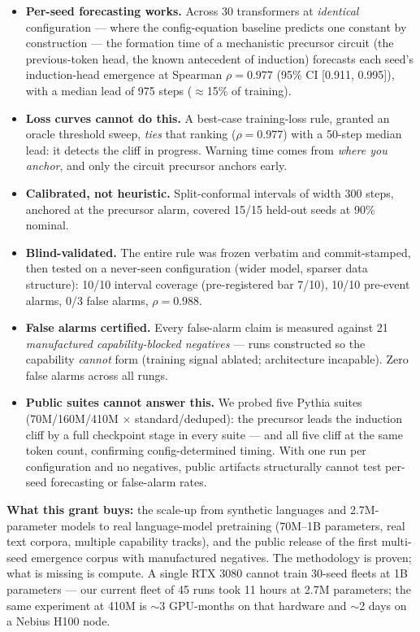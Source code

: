 \documentclass[11pt]{article}
\begin{document}
\begin{itemize}
\item \textbf{Per-seed forecasting works.} Across 30 transformers at \emph{identical}
  configuration --- where the config-equation baseline predicts one constant by
  construction --- the formation time of a mechanistic precursor circuit (the
  previous-token head, the known antecedent of induction) forecasts each seed's
  induction-head emergence at Spearman $\rho = 0.977$ (95\% CI [0.911, 0.995]), with a
  median lead of 975 steps ($\approx$15\% of training).
\item \textbf{Loss curves cannot do this.} A best-case training-loss rule, granted an
  oracle threshold sweep, \emph{ties} that ranking ($\rho = 0.977$) with a 50-step median
  lead: it detects the cliff in progress. Warning time comes from \emph{where you anchor},
  and only the circuit precursor anchors early.
\item \textbf{Calibrated, not heuristic.} Split-conformal intervals of width 300 steps,
  anchored at the precursor alarm, covered 15/15 held-out seeds at 90\% nominal.
\item \textbf{Blind-validated.} The entire rule was frozen verbatim and commit-stamped,
  then tested on a never-seen configuration (wider model, sparser data structure): 10/10
  interval coverage (pre-registered bar 7/10), 10/10 pre-event alarms, 0/3 false alarms,
  $\rho = 0.988$.
\item \textbf{False alarms certified.} Every false-alarm claim is measured against 21
  \emph{manufactured capability-blocked negatives} --- runs constructed so the capability
  \emph{cannot} form (training signal ablated; architecture incapable). Zero false alarms
  across all rungs.
\item \textbf{Public suites cannot answer this.} We probed five Pythia suites
  (70M/160M/410M $\times$ standard/deduped): the precursor leads the induction cliff by a
  full checkpoint stage in every suite --- and all five cliff at the same token count,
  confirming config-determined timing. With one run per configuration and no negatives,
  public artifacts structurally cannot test per-seed forecasting or false-alarm rates.
\end{itemize}

\textbf{What this grant buys:} the scale-up from synthetic languages and 2.7M-parameter
models to real language-model pretraining (70M--1B parameters, real text corpora, multiple
capability tracks), and the public release of the first multi-seed emergence corpus with
manufactured negatives. The methodology is proven; what is missing is compute. A single
RTX 3080 cannot train 30-seed fleets at 1B parameters --- our current fleet of 45 runs
took 11 hours at 2.7M parameters; the same experiment at 410M is $\sim$3 GPU-months on
that hardware and $\sim$2 days on a Nebius H100 node.
\end{document}

